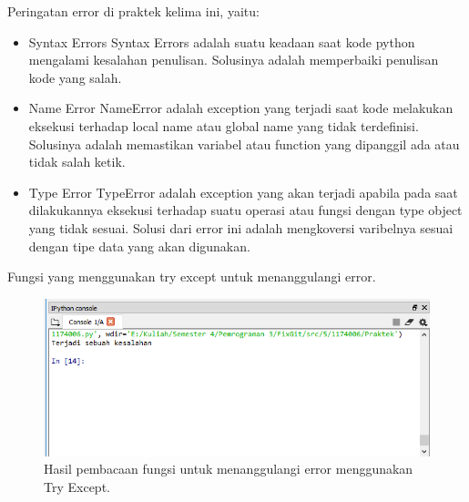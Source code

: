 \hfill \break
Peringatan error di praktek kelima ini, yaitu:
\begin{itemize}
	\item Syntax Errors
	Syntax Errors adalah suatu keadaan saat kode python mengalami kesalahan penulisan. Solusinya adalah memperbaiki penulisan kode yang salah.
	
	\item Name Error
	NameError adalah exception yang terjadi saat kode melakukan eksekusi terhadap local name atau global name yang tidak terdefinisi. Solusinya adalah memastikan variabel atau function yang dipanggil ada atau tidak salah ketik.
	
	\item Type Error
	TypeError adalah exception yang akan terjadi apabila pada saat dilakukannya eksekusi terhadap suatu operasi atau fungsi dengan type object yang tidak sesuai. Solusi dari error ini adalah mengkoversi varibelnya sesuai dengan tipe data yang akan digunakan.
\end{itemize}

\hfill \break
Fungsi yang menggunakan try except untuk menanggulangi error.



\begin{figure}[H]
	\includegraphics[width=12cm]{figures/5/1174089/Praktek/5.png}
	\centering
	\caption{Hasil pembacaan fungsi untuk menanggulangi error menggunakan Try Except.}
\end{figure}

